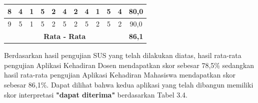 \begin{table}[H]
\begin{tabular}{|c|c|c|c|c|c|c|c|c|c|c|c|}
8                                   & 4           & 1           & 5           & 2           & 4           & 2           & 4           & 1           & 5           & 4                                 & 80,0                                 \\ \hline
9                                   & 5           & 1           & 5           & 2           & 5           & 2           & 5           & 2           & 5           & 2                                 & 90,0                                 \\ \hline
\multicolumn{11}{|c|}{\textbf{Rata - Rata}}                                                                                                                                                             & \textbf{86,1}                      \\ \hline
\end{tabular}
\end{table}

\par Berdasarkan hasil pengujian SUS yang telah dilakukan diatas, hasil rata-rata pengujian Aplikasi Kehadiran Dosen mendapatkan skor sebesar 78,5\% sedangkan hasil rata-rata pengujian Aplikasi Kehadiran Mahasiswa mendapatkan skor sebesar 86,1\%. Dapat dilihat bahwa kedua aplikasi yang telah dibangun memiliki skor interpretasi \textbf{"dapat diterima"} berdasarkan Tabel 3.4.  

